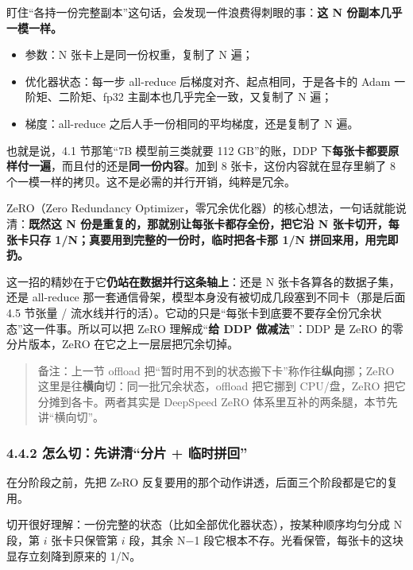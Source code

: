 \documentclass[
  chinese,
]{ctexart}
\providecommand{\tightlist}{%
  \setlength{\itemsep}{0pt}\setlength{\parskip}{0pt}}
\begin{document}
盯住``各持一份完整副本''这句话，会发现一件浪费得刺眼的事：\textbf{这 N
份副本几乎一模一样。}

\begin{itemize}
\tightlist
\item
  参数：N 张卡上是同一份权重，复制了 N 遍；
\item
  优化器状态：每一步 all-reduce 后梯度对齐、起点相同，于是各卡的 Adam
  一阶矩、二阶矩、fp32 主副本也几乎完全一致，又复制了 N 遍；
\item
  梯度：all-reduce 之后人手一份相同的平均梯度，还是复制了 N 遍。
\end{itemize}

也就是说，4.1 节那笔``7B 模型前三类就要 112 GB''的账，DDP
下\textbf{每张卡都要原样付一遍}，而且付的还是\textbf{同一份内容}。加到 8
张卡，这份内容就在显存里躺了 8
个一模一样的拷贝。这不是必需的并行开销，纯粹是冗余。

ZeRO（Zero Redundancy
Optimizer，零冗余优化器）的核心想法，一句话就能说清：\textbf{既然这 N
份是重复的，那就别让每张卡都存全份，把它沿 N 张卡切开，每张卡只存
1/N；真要用到完整的一份时，临时把各卡那 1/N 拼回来用，用完即扔。}

这一招的精妙在于它\textbf{仍站在数据并行这条轴上}：还是 N
张卡各算各的数据子集，还是 all-reduce
那一套通信骨架，模型本身没有被切成几段塞到不同卡（那是后面 4.5 节张量 /
流水线并行的活）。它动的只是``每张卡到底要不要存全份冗余状态''这一件事。所以可以把
ZeRO 理解成``\textbf{给 DDP 做减法}''：DDP 是 ZeRO 的零分片版本，ZeRO
在它之上一层层把冗余切掉。

\begin{quote}
备注：上一节 offload
把``暂时用不到的状态搬下卡''称作往\textbf{纵向}挪；ZeRO
这里是往\textbf{横向}切：同一批冗余状态，offload 把它挪到 CPU/盘，ZeRO
把它分摊到各卡。两者其实是 DeepSpeed ZeRO
体系里互补的两条腿，本节先讲``横向切''。
\end{quote}

\subsubsection{4.4.2 怎么切：先讲清``分片 +
临时拼回''}\label{ux600eux4e48ux5207ux5148ux8bb2ux6e05ux5206ux7247-ux4e34ux65f6ux62fcux56de}

在分阶段之前，先把 ZeRO
反复要用的那个动作讲透，后面三个阶段都是它的复用。

切开很好理解：一份完整的状态（比如全部优化器状态），按某种顺序均匀分成 N
段，第 \(i\) 张卡只保管第 \(i\) 段，其余 N−1
段它根本不存。光看保管，每张卡的这块显存立刻降到原来的 1/N。
\end{document}
